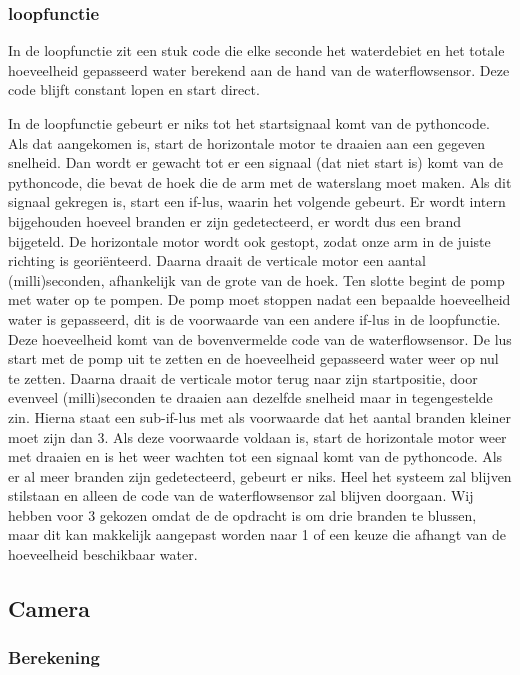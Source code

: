 \documentclass[kulak]{kulakarticle} %
\begin{document}
			
		\subsubsection{loopfunctie}
		
			In de loopfunctie zit een stuk code die elke seconde het waterdebiet en het totale hoeveelheid gepasseerd water berekend aan de hand van de waterflowsensor. Deze code blijft constant lopen en start direct.
			
			In de loopfunctie gebeurt er niks tot het startsignaal komt van de pythoncode. Als dat aangekomen is, start de horizontale motor te draaien aan een gegeven snelheid. Dan wordt er gewacht tot er een signaal (dat niet start is) komt van de pythoncode, die bevat de hoek die de arm met de waterslang moet maken. Als dit signaal gekregen is, start een if-lus, waarin het volgende gebeurt. Er wordt intern bijgehouden hoeveel branden er zijn gedetecteerd, er wordt dus een brand bijgeteld. De horizontale motor wordt ook gestopt, zodat onze arm in de juiste richting is georiënteerd. Daarna draait de verticale motor een aantal (milli)seconden, afhankelijk van de grote van de hoek. Ten slotte begint de pomp met water op te pompen.
			De pomp moet stoppen nadat een bepaalde hoeveelheid water is gepasseerd, dit is de voorwaarde van een andere if-lus in de loopfunctie. Deze hoeveelheid komt van de bovenvermelde code van de waterflowsensor. De lus start met de pomp uit te zetten en de hoeveelheid gepasseerd water weer op nul te zetten. Daarna draait de verticale motor terug naar zijn startpositie, door evenveel (milli)seconden te draaien aan dezelfde snelheid maar in tegengestelde zin. Hierna staat een sub-if-lus met als voorwaarde dat het aantal branden kleiner moet zijn dan 3. Als deze voorwaarde voldaan is, start de horizontale motor weer met draaien en is het weer wachten tot een signaal komt van de pythoncode. Als er al meer branden zijn gedetecteerd, gebeurt er niks. Heel het systeem zal blijven stilstaan en alleen de code van de waterflowsensor zal blijven doorgaan. Wij hebben voor 3 gekozen omdat de de opdracht is om drie branden te blussen, maar dit kan makkelijk aangepast worden naar 1 of een keuze die afhangt van de hoeveelheid beschikbaar water.     
		

	\subsection{Camera}
	
	
		\subsubsection{Berekening}
		
\end{document}
